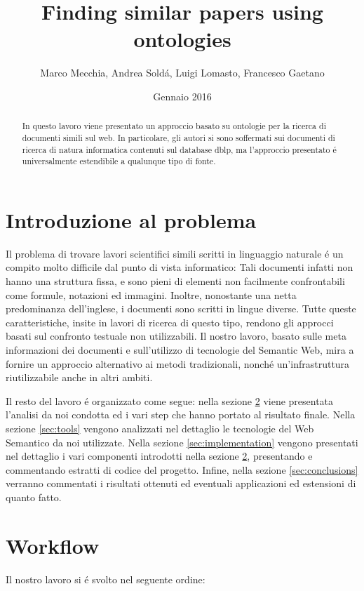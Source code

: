 \documentclass[11pt,twoside,a4paper]{article}
\begin{document}
\title{Finding similar papers using ontologies}
\author{Marco Mecchia, Andrea Sold\'a, Luigi Lomasto, Francesco Gaetano}
\date{Gennaio 2016}
\maketitle
\begin{abstract}
In questo lavoro viene presentato un approccio basato su ontologie per la ricerca di documenti simili sul web. In particolare, gli autori si sono soffermati sui documenti di ricerca di natura informatica contenuti sul database dblp, ma l'approccio presentato \'e universalmente estendibile a qualunque tipo di fonte.
\end{abstract}

\section{Introduzione al problema}
Il problema di trovare lavori scientifici simili scritti in linguaggio naturale \'e un compito molto difficile dal punto di vista informatico: Tali documenti infatti non hanno una struttura fissa, e sono pieni  di elementi non facilmente confrontabili come formule, notazioni ed immagini. Inoltre, nonostante una netta predominanza dell'inglese, i documenti sono scritti in lingue diverse. Tutte queste caratteristiche, insite in lavori di ricerca di questo tipo, rendono gli approcci basati sul confronto testuale non utilizzabili. Il nostro lavoro, basato sulle meta informazioni dei documenti e sull'utilizzo di tecnologie del Semantic Web, mira a fornire un approccio alternativo ai metodi tradizionali, nonch\'e un'infrastruttura riutilizzabile anche in altri ambiti.

Il resto del lavoro \'e organizzato come segue: nella sezione \ref{sec:workflow} viene presentata l'analisi da noi condotta ed i vari step che hanno portato al risultato finale. Nella sezione \ref{sec:tools} vengono analizzati nel dettaglio le tecnologie del Web Semantico da noi utilizzate. Nella sezione \ref{sec:implementation} vengono presentati nel dettaglio i vari componenti introdotti nella sezione \ref{sec:workflow}, presentando e commentando estratti di codice del progetto. Infine, nella sezione \ref{sec:conclusions} verranno commentati i risultati ottenuti ed eventuali applicazioni ed estensioni di quanto fatto.

\section{Workflow}
\label{sec:workflow}
Il nostro lavoro si \'e svolto nel seguente ordine:
\end{document}
